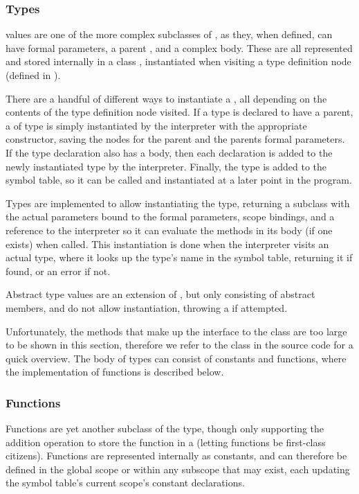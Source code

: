 \subsubsection{Types}
 values are one of the more complex subclasses of
, as they, when defined, can have formal parameters, a parent
, and a complex body. These are all represented and stored
internally in a class , instantiated when visiting a type
definition node (defined in ).

There are a handful of different ways to instantiate a , all
depending on the contents of the type definition node visited.  If a type is
declared to have a parent, a  of type  is simply
instantiated by the interpreter with the appropriate constructor, saving the
nodes for the parent and the parents formal parameters. If the type declaration
also has a body, then each declaration is added to the newly instantiated type
by the interpreter.  Finally, the type is added to the symbol table, so it can
be called and instantiated at a later point in the program.

Types are implemented to allow instantiating the type, returning a
 subclass with the actual parameters bound to the formal
parameters, scope bindings, and a reference to the interpreter so it can
evaluate the methods in its body (if one exists) when called. This
instantiation is done when the interpreter visits an actual type, where it looks
up the type's name in the symbol table, returning it if found, or an error if
not.

Abstract type values are an extension of , but only consisting of
abstract members, and do not allow instantiation, throwing a
 if attempted.

Unfortunately, the methods that make up the interface to the 
class are too large to be shown in this section, therefore we refer to the
 class in the source code for a quick overview. The body of
types can consist of constants and functions, where the implementation of
functions is described below.

\subsubsection{Functions}
Functions are yet another subclass of the  type,
though only supporting the addition operation to store the function in
a  (letting functions be first-class citizens).
Functions are represented internally as constants, and can therefore be
defined in the global scope or within any subscope that may exist, each
updating the symbol table's current scope's constant declarations.

